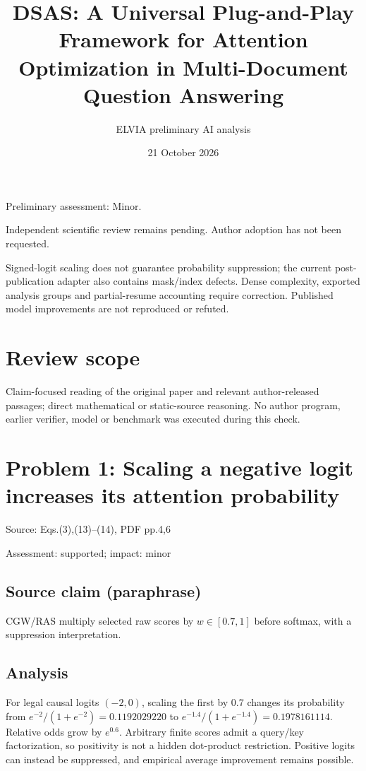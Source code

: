 \documentclass[11pt]{article}
\begin{document}
\title{DSAS: A Universal Plug-and-Play Framework for Attention Optimization in Multi-Document Question Answering}

\author{ELVIA preliminary AI analysis}\date{21 October 2026}\maketitle

Preliminary assessment: Minor.\par

Independent scientific review remains pending. Author adoption has not been requested.

Signed-logit scaling does not guarantee probability suppression; the current post-publication adapter also contains mask/index defects. Dense complexity, exported analysis groups and partial-resume accounting require correction. Published model improvements are not reproduced or refuted.

\section*{Review scope}

Claim-focused reading of the original paper and relevant author-released passages; direct mathematical or static-source reasoning. No author program, earlier verifier, model or benchmark was executed during this check.

\section*{Problem 1: Scaling a negative logit increases its attention probability}

Source: Eqs.(3),(13)–(14), PDF pp.4,6

Assessment: supported; impact: minor

\subsection*{Source claim (paraphrase)}

CGW/RAS multiply selected raw scores by \(w\in[0.7,1]\) before softmax, with a suppression interpretation.

\subsection*{Analysis}

For legal causal logits \((-2,0)\), scaling the first by \(0.7\) changes its probability from \(e^{-2}/(1+e^{-2})=0.1192029220\) to \(e^{-1.4}/(1+e^{-1.4})=0.1978161114\). Relative odds grow by \(e^{0.6}\). Arbitrary finite scores admit a query/key factorization, so positivity is not a hidden dot-product restriction. Positive logits can instead be suppressed, and empirical average improvement remains possible.
\end{document}
